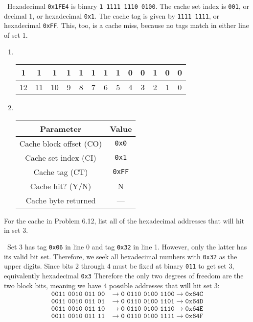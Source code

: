 \documentclass[12pt]{article}
\newenvironment{ex}[2][Exercise]{\begin{trivlist}
		\item[\hskip \labelsep {\bfseries #1}\hskip \labelsep {\bfseries #2.}]}{\end{trivlist}}
\newenvironment{sol}[1][Solution]{\begin{trivlist}
		\item[\hskip \labelsep {\bfseries #1:}]}{\end{trivlist}}
\begin{document}
\begin{sol}
	\
	Hexadecimal \texttt{0x1FE4} is binary \texttt{1 1111 1110 0100}. The cache set index is
	\texttt{001}, or decimal 1, or hexadecimal \texttt{0x1}. The cache tag is given by
	\texttt{1111 1111}, or hexadecimal \texttt{0xFF}. This, too, is a cache miss, because
	no tags match in either line of set 1.
	\begin{enumerate}[label=(\alph*)]
		\item \
		\begin{center}
			\begin{tabular}{|c|c|c|c|c|c|c|c|c|c|c|c|c|}
				\hline
				1 & 1 & 1 & 1 & 1 & 1 & 1 & 1 & 0 & 0 & 1 & 0 & 0\\
				\hline
				12 & 11 & 10 & 9 & 8 & 7 & 6 & 5 & 4 & 3 & 2 & 1 & 0
			\end{tabular}
		\end{center}
		\item \
		\begin{center}
			\begin{tabular}{cc}
				Parameter & Value\\
				\hline
				Cache block offset (CO) & \texttt{0x0}\\
				Cache set index (CI) & \texttt{0x1}\\
				Cache tag (CT) & \texttt{0xFF}\\
				Cache hit? (Y/N) & N\\
				Cache byte returned & ---
			\end{tabular}
		\end{center}
	\end{enumerate}
\end{sol}

\begin{ex}{6.16}
	For the cache in Problem 6.12, list all of the hexadecimal addresses that will hit in
	set 3.
\end{ex}

\begin{sol}
	\
	Set 3 has tag \texttt{0x06} in line 0 and tag \texttt{0x32} in line 1. However, only the
	latter has its valid bit set. Therefore, we seek all hexadecimal numbers with \texttt{0x32}
	as the upper digits. Since bits 2 through 4 must be fixed at binary \texttt{011} to get
	set 3, equivalently hexadecimal \texttt{0x3} Therefore the only two degrees of freedom
	are the two block bits, meaning we have 4 possible addresses that will hit set 3:
	\begin{align*}
		\texttt{0011 0010 011 00} &\to \texttt{0 0110 0100 1100} \to \texttt{0x64C}\\
		\texttt{0011 0010 011 01} &\to \texttt{0 0110 0100 1101} \to \texttt{0x64D}\\
		\texttt{0011 0010 011 10} &\to \texttt{0 0110 0100 1110} \to \texttt{0x64E}\\
		\texttt{0011 0010 011 11} &\to \texttt{0 0110 0100 1111} \to \texttt{0x64F}
	\end{align*}
\end{sol}
\end{document}
